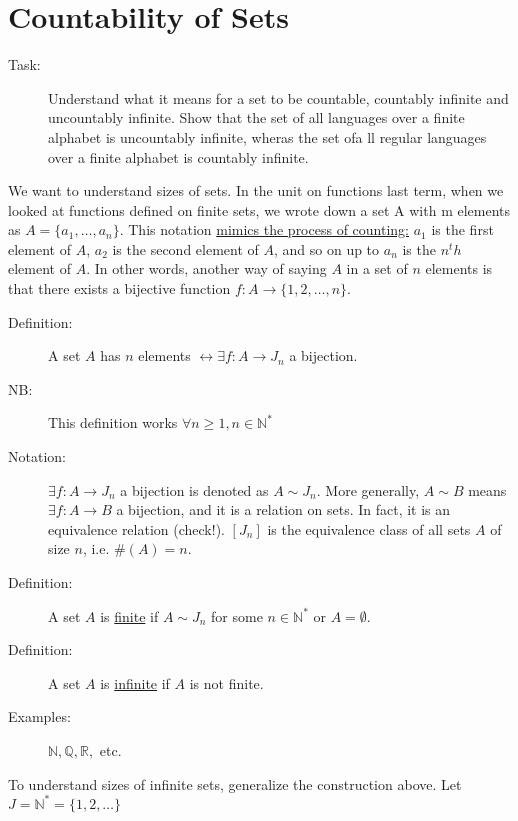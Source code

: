 \section{Countability of Sets}
	\begin{description}
		\item[Task:] Understand what it means for a set to be countable, countably infinite and uncountably infinite. Show that the set of all languages over a finite alphabet is uncountably infinite, wheras the set ofa ll regular languages over a finite alphabet is countably infinite.
	\end{description}

	We want to understand sizes of sets.
	In the unit on functions last term, when we looked at functions defined on finite sets, we wrote down a set A with m elements as $A = \{a_1, \dots, a_n\}$.
	This notation \underline{mimics the process of counting:} $a_1$ is the first element of $A$, $a_2$ is the second element of $A$, and so on up to $a_n$ is the $n^th$ element of $A$.
	In other words, another way of saying $A$ in a set of $n$ elements is that there exists a bijective function $f: A \rightarrow \{1, 2, \dots, n\}$.

	\begin{description}
		\item[Definition:] A set $A$ has $n$ elements $\leftrightarrow \exists f: A \rightarrow J_n$ a bijection.
		\item[NB:] This definition works $\forall n \geq 1, n \in \mathbb{N}^\ast$
		\item[Notation:] $\exists f: A \rightarrow J_n$ a bijection is denoted as $A \sim J_n$.
			More generally, $A \sim B$ means $\exists f: A \rightarrow B$ a bijection, and it is a relation on sets.
			In fact, it is an equivalence relation (check!). $[J_n]$ is the equivalence class of all sets $A$ of size $n$, i.e. $\#(A) = n$.
	\end{description}

	\begin{description}
		\item[Definition:] A set $A$ is \underline{finite} if $A \sim J_n$ for some $n \in \mathbb{N}^\ast$ or $A = \emptyset$.
		\item[Definition:] A set $A$ is \underline{infinite} if $A$ is not finite.
		\item[Examples:] $\mathbb{N, Q, R,}$ etc.
	\end{description}

	To understand sizes of infinite sets, generalize the construction above. Let $J = \mathbb{N}^\ast = \{1, 2, \dots \}$

